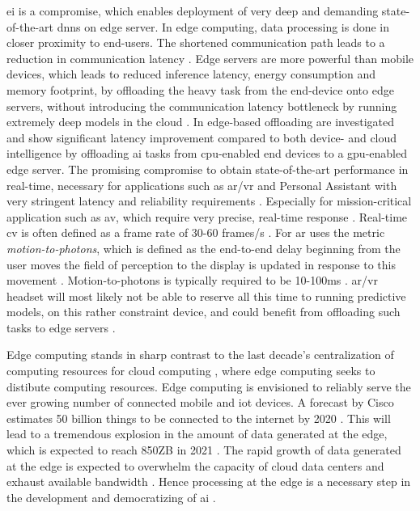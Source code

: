 \gls{ei} is a compromise, which enables deployment of very deep and demanding state-of-the-art \gls{dnn}s on edge server. In edge computing, data processing is done in closer proximity to end-users. The shortened communication path leads to a reduction in communication latency \cite{shi_edge_2016}. Edge servers are more powerful than mobile devices, which leads to reduced inference latency, energy consumption and memory footprint, by offloading the heavy task from the end-device onto edge servers, without introducing the communication latency bottleneck by running extremely deep models in the cloud \cite{zhou_edge_2019}. In \cite{karlsen_prototyping_nodate} edge-based offloading are investigated and show significant latency improvement compared to both device- and cloud intelligence by offloading \gls{ai} tasks from \gls{cpu}-enabled end devices to a \gls{gpu}-enabled edge server. The promising compromise to obtain state-of-the-art performance in real-time, necessary for applications such as \gls{ar}/\gls{vr} and Personal Assistant with very stringent latency and reliability requirements \cite{zhou_edge_2019}. Especially for mission-critical application such as \gls{av}, which require very precise, real-time response \cite{stoica_berkeley_2017}. Real-time \gls{cv} is often defined as a frame rate of 30-60 frames/s \cite{chen_deep_2019}. For \gls{ar} uses the metric \emph{motion-to-photons}, which is defined as the end-to-end delay beginning from the user moves the field of perception to the display is updated in response to this movement \cite{lavalle_virtual_2019}. Motion-to-photons is typically required to be 10-100ms \cite{chen_deep_2019}. \gls{ar}/\gls{vr} headset will most likely not be able to reserve all this time to running predictive models, on this rather constraint device, and could benefit from offloading such tasks to edge servers \cite{chen_deep_2019}.

Edge computing stands in sharp contrast to the last decade's centralization of computing resources for cloud computing \cite{shi_edge_2016}, where edge computing seeks to distibute computing resources. Edge computing is envisioned to reliably serve the ever growing number of connected mobile and \gls{iot} devices. A forecast by Cisco estimates 50 billion things to be connected to the internet by 2020 \cite{evans_internet_2011}. This will lead to a tremendous explosion in the amount of data generated at the edge, which is expected to reach 850ZB in 2021 \cite{cisco_cisco_2018}. The rapid growth of data generated at the edge is expected to overwhelm the capacity of cloud data centers and exhaust available bandwidth . Hence processing at the edge is a necessary step in the development and democratizing of \gls{ai} \cite{zhou_edge_2019}.


